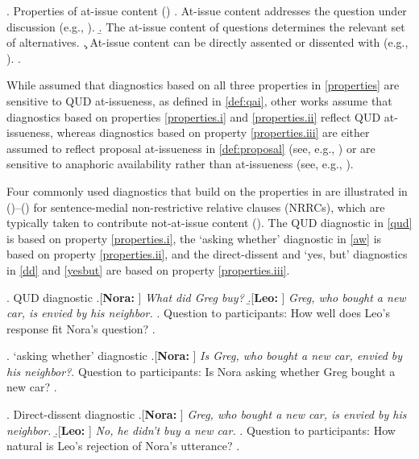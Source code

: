 \documentclass[times,linguex]{glossa}
\begin{document}
\ex.\label{properties} Properties of at-issue content (\citealt{tonhauser_diagnosing_2012})
\a.\label{properties.i} At-issue content addresses the question under discussion (e.g.,  \citealt{amaral_review_2007,simons_what_2010}).
\b.\label{properties.ii} The at-issue content of questions determines the relevant set of alternatives.
\c.\label{properties.iii} At-issue content can be directly assented or dissented with (e.g., \citealt{shanon_two_1976,groenendijk_studies_1984,faller_semantics_2002,faller_evidentiality_2006,murray_evidentiality_2010}).
\z.

While \citealt{tonhauser_diagnosing_2012} assumed that diagnostics based on all three properties in \ref{properties} are sensitive to QUD at-issueness, as defined in \ref{def:qai}, other works assume that diagnostics based on properties \ref{properties.i} and \ref{properties.ii} reflect QUD at-issueness, whereas diagnostics based on property \ref{properties.iii} are either assumed to reflect proposal at-issueness in \ref{def:proposal} (see, e.g., \citealt{koev_notions_2018}) or are sensitive to anaphoric availability rather than at-issueness (see, e.g., \citealt{snider_anaphoric_2017,korotkova_evidential_2020}). 

Four commonly used diagnostics that build on the properties in \Last are illustrated in ()--() for sentence-medial non-restrictive relative clauses (NRRCs), which are typically taken to contribute not-at-issue content (\citealt{potts_logic_2005}). The QUD diagnostic in \ref{qud} is based on property \ref{properties.i}, the `asking whether' diagnostic in \ref{aw} is based on property \ref{properties.ii}, and the direct-dissent and `yes, but' diagnostics in \ref{dd} and \ref{yesbut} are based on property \ref{properties.iii}.

\ex. \label{qud}%
QUD diagnostic%
\a.[{\bf Nora: }] \emph{What did Greg buy?}
\b.[{\bf Leo: }] \emph{Greg, who bought a new car, is envied by his neighbor.}
\z.
Question to participants: How well does Leo's response fit Nora's question?
\z.

\ex. \label{aw}%
`asking whether' diagnostic
\a.[{\bf Nora: }] \emph{Is Greg, who bought a new car, envied by his neighbor?}\z.
Question to participants: Is Nora asking whether Greg bought a new car?
\z.

\begin{samepage}
  \ex. \label{dd} Direct-dissent diagnostic%
  \a.[{\bf Nora: }] \emph{Greg, who bought a new car, is envied by his neighbor.}
  \b.[{\bf Leo: }] \emph{No, he didn't buy a new car.}
  \z.
  Question to participants: How natural is Leo's rejection of Nora's utterance?
  \z.
\end{samepage}
\end{document}
